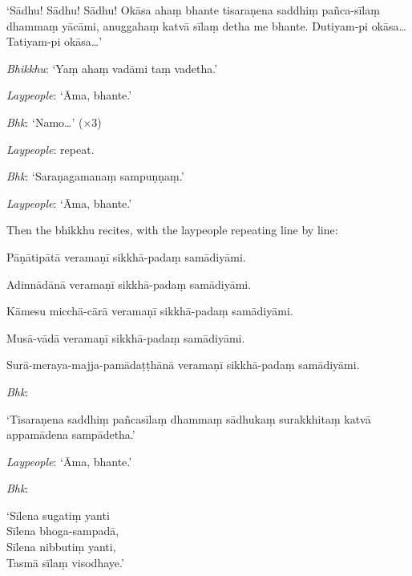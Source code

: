 ‘Sādhu! Sādhu! Sādhu! Okāsa ahaṃ bhante tisaraṇena saddhiṃ pañca-sīlaṃ dhammaṃ
yācāmi, anuggahaṃ katvā sīlaṃ detha me bhante. Dutiyam-pi okāsa… Tatiyam-pi
okāsa…’

\emph{Bhikkhu}: ‘Yaṃ ahaṃ vadāmi taṃ vadetha.’

\emph{Laypeople}: ‘Āma, bhante.’

\emph{Bhk}: ‘Namo…’ (×3)

\emph{Laypeople}: repeat.

\emph{Bhk}: ‘Saraṇagamanaṃ sampuṇṇaṃ.’

\emph{Laypeople}: ‘Āma, bhante.’

Then the bhikkhu recites, with the laypeople repeating line by line:

\begin{packeditemize}

\item Pāṇātipātā veramaṇī sikkhā-padaṃ samādiyāmi.
\item Adinnādānā veramaṇī sikkhā-padaṃ samādiyāmi.
\item Kāmesu micchā-cārā veramaṇī sikkhā-padaṃ samādiyāmi.
\item Musā-vādā veramaṇī sikkhā-padaṃ samādiyāmi.
\item Surā-meraya-majja-pamādaṭṭhānā veramaṇī sikkhā-padaṃ samādiyāmi.

\end{packeditemize}


\emph{Bhk}:

‘Tisaraṇena saddhiṃ pañcasīlaṃ dhammaṃ sādhukaṃ surakkhitaṃ katvā appamādena
sampādetha.’

\emph{Laypeople}: ‘Āma, bhante.’

\emph{Bhk}:

‘Sīlena sugatiṃ yanti\\
Sīlena bhoga-sampadā,\\
Sīlena nibbutiṃ yanti,\\
Tasmā sīlaṃ visodhaye.’

